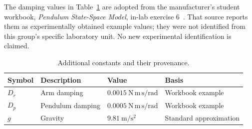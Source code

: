 The damping values in Table~\ref{tab:additional} are adopted from the
manufacturer's student workbook, \emph{Pendulum State-Space Model}, in-lab
exercise 6~\cite{qube_courseware}. That source reports them as experimentally
obtained example values; they were not identified from this group's
specific laboratory unit. No new experimental identification is claimed.
\begin{table}[H]\centering
\caption{Additional constants and their provenance.}
\label{tab:additional}
\begin{tabular}{llll}
\toprule
\textbf{Symbol}&\textbf{Description}&\textbf{Value}&\textbf{Basis}\\
\midrule
$D_r$&Arm damping&$0.0015~\mathrm{N\,m\,s/rad}$&Workbook example\\
$D_p$&Pendulum damping&$0.0005~\mathrm{N\,m\,s/rad}$&Workbook example\\
$g$&Gravity&$9.81~\mathrm{m/s^2}$&Standard approximation\\
\bottomrule
\end{tabular}
\end{table}

